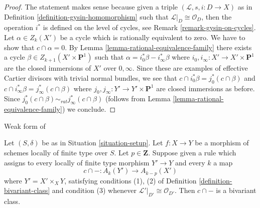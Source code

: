\begin{proof}
The statement makes sense because given a triple
$(\mathcal{L}, s, i : D \to X)$ as in
Definition \ref{definition-gysin-homomorphism}
such that $\mathcal{L}|_D \cong \mathcal{O}_D$, then
the operation $i^*$ is defined on the level of cycles, see
Remark \ref{remark-gysin-on-cycles}.
Let $\alpha \in Z_k(X')$ be a cycle which is rationally equivalent to zero.
We have to show that $c \cap \alpha = 0$. By
Lemma \ref{lemma-rational-equivalence-family}
there exists a cycle $\beta \in Z_{k + 1}(X' \times \mathbf{P}^1)$
such that $\alpha = i_0^*\beta - i_\infty^*\beta$
where $i_0, i_\infty : X' \to X' \times \mathbf{P}^1$ are the
closed immersions of $X'$ over $0, \infty$. Since these are
examples of effective Cartier divisors with trivial normal
bundles, we see that $c \cap i_0^*\beta = j_0^*(c \cap \beta)$
and $c \cap i_\infty^*\beta = j_\infty^*(c \cap \beta)$
where $j_0, j_\infty : Y' \to Y' \times \mathbf{P}^1$ are
closed immersions as before. Since
$j_0^*(c \cap \beta) \sim_{rat} j_\infty^*(c \cap \beta)$
(follows from Lemma \ref{lemma-rational-equivalence-family}) we conclude.
\end{proof}

\begin{lemma}
\label{lemma-bivariant-weaker}
\begin{reference}
Weak form of \cite[Theorem 17.1]{F}
\end{reference}
Let $(S, \delta)$ be as in Situation \ref{situation-setup}.
Let $f : X \to Y$ be a morphism of schemes locally of finite type over $S$.
Let $p \in \mathbf{Z}$. Suppose given a rule
which assigns to every locally of finite type morphism $Y' \to Y$
and every $k$ a map
$$
c \cap - : A_k(Y') \longrightarrow A_{k - p}(X')
$$
where $Y' = X' \times_X Y$, satisfying conditions (1), (2) of
Definition \ref{definition-bivariant-class}
and condition (3) whenever $\mathcal{L}'|_{D'} \cong \mathcal{O}_{D'}$. Then
$c \cap -$ is a bivariant class.
\end{lemma}

